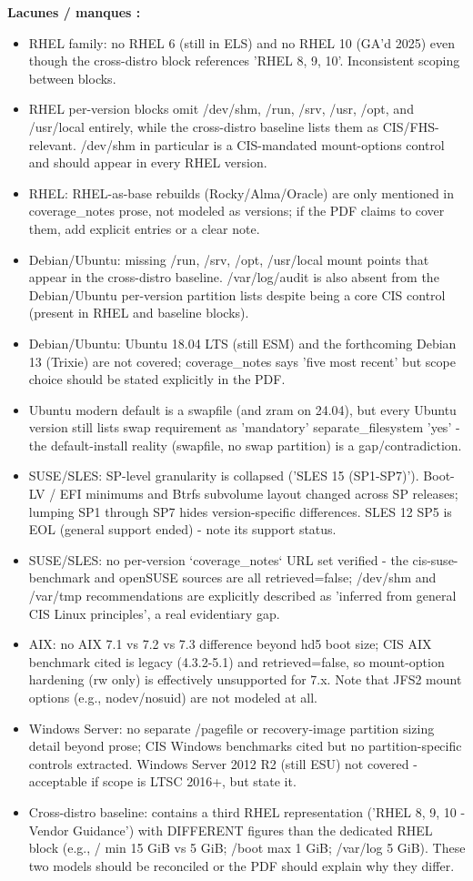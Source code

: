 \documentclass[10pt,a4paper]{article}
\begin{document}
\noindent\textbf{Lacunes / manques :}
\begin{itemize}[leftmargin=1.6em]
\item RHEL family: no RHEL 6 (still in ELS) and no RHEL 10 (GA'd 2025) even though the cross-distro block references 'RHEL 8, 9, 10'. Inconsistent scoping between blocks.
\item RHEL per-version blocks omit /dev/shm, /run, /srv, /usr, /opt, and /usr/local entirely, while the cross-distro baseline lists them as CIS/FHS-relevant. /dev/shm in particular is a CIS-mandated mount-options control and should appear in every RHEL version.
\item RHEL: RHEL-as-base rebuilds (Rocky/Alma/Oracle) are only mentioned in coverage\_notes prose, not modeled as versions; if the PDF claims to cover them, add explicit entries or a clear note.
\item Debian/Ubuntu: missing /run, /srv, /opt, /usr/local mount points that appear in the cross-distro baseline. /var/log/audit is also absent from the Debian/Ubuntu per-version partition lists despite being a core CIS control (present in RHEL and baseline blocks).
\item Debian/Ubuntu: Ubuntu 18.04 LTS (still ESM) and the forthcoming Debian 13 (Trixie) are not covered; coverage\_notes says 'five most recent' but scope choice should be stated explicitly in the PDF.
\item Ubuntu modern default is a swapfile (and zram on 24.04), but every Ubuntu version still lists swap requirement as 'mandatory' separate\_filesystem 'yes' - the default-install reality (swapfile, no swap partition) is a gap/contradiction.
\item SUSE/SLES: SP-level granularity is collapsed ('SLES 15 (SP1-SP7)'). Boot-LV / EFI minimums and Btrfs subvolume layout changed across SP releases; lumping SP1 through SP7 hides version-specific differences. SLES 12 SP5 is EOL (general support ended) - note its support status.
\item SUSE/SLES: no per-version `coverage\_notes` URL set verified - the cis-suse-benchmark and openSUSE sources are all retrieved=false; /dev/shm and /var/tmp recommendations are explicitly described as 'inferred from general CIS Linux principles', a real evidentiary gap.
\item AIX: no AIX 7.1 vs 7.2 vs 7.3 difference beyond hd5 boot size; CIS AIX benchmark cited is legacy (4.3.2-5.1) and retrieved=false, so mount-option hardening (rw only) is effectively unsupported for 7.x. Note that JFS2 mount options (e.g., nodev/nosuid) are not modeled at all.
\item Windows Server: no separate /pagefile or recovery-image partition sizing detail beyond prose; CIS Windows benchmarks cited but no partition-specific controls extracted. Windows Server 2012 R2 (still ESU) not covered - acceptable if scope is LTSC 2016+, but state it.
\item Cross-distro baseline: contains a third RHEL representation ('RHEL 8, 9, 10 - Vendor Guidance') with DIFFERENT figures than the dedicated RHEL block (e.g., / min 15 GiB vs 5 GiB; /boot max 1 GiB; /var/log 5 GiB). These two models should be reconciled or the PDF should explain why they differ.
\end{itemize}
\end{document}
